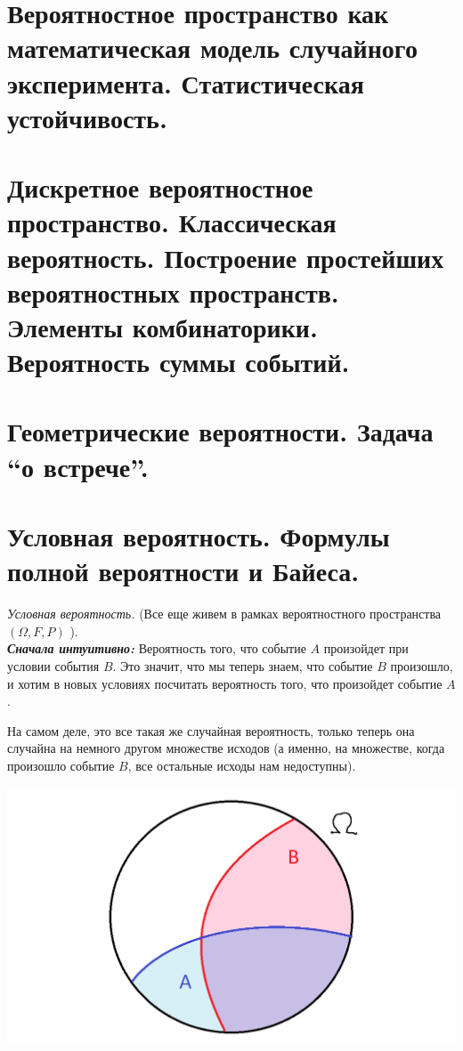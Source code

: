 \section{Вероятностное пространство как математическая модель случайного эксперимента. Статистическая устойчивость.}


\section{Дискретное вероятностное пространство. Классическая вероятность. Построение простейших вероятностных пространств. Элементы комбинаторики. Вероятность суммы событий.}


\section{Геометрические вероятности. Задача “о встрече”.}

\newpage{}

\section{Условная вероятность. Формулы полной вероятности и Байеса.}

\Def \textit{Условная вероятность.} (Все еще живем в рамках вероятностного пространства $(\Omega, F, P)$ ).\\

\textbf{\textit{Сначала интуитивно:}}
Вероятность того, что событие $A$ произойдет при условии события $B$. Это значит, что мы теперь знаем, что событие $B$ произошло, и хотим в новых условиях посчитать вероятность того, что произойдет событие $A$.

На самом деле, это все такая же случайная вероятность, только теперь она случайна на немного другом множестве исходов (а именно, на множестве, когда произошло событие $B$, все остальные исходы нам недоступны).

\begin{minipage}[r]{0.15\linewidth} 
    \includegraphics[width=2\linewidth]{images/4_1.png}
\end{minipage} \\


